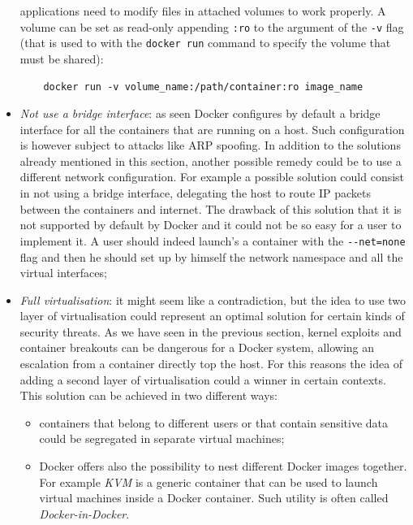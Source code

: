 \documentclass[a4paper,12pt]{article}
\newcommand{\code}[1]{\lstinline|#1|}
\begin{document}
\begin{itemize}
  applications need to modify files in attached volumes to work properly. A
  volume can be set as read-only appending \code{:ro} to the argument of the
  \code{-v} flag (that is used to with the \code{docker run} command to
  specify the volume that must be shared): 
  \begin{lstlisting}
    docker run -v volume_name:/path/container:ro image_name
  \end{lstlisting}
  \item \textit{Not use a bridge interface}: as seen Docker configures by
  default a bridge interface for all the containers that are running on a host.
  Such configuration is however subject to attacks like ARP spoofing. In
  addition to the solutions already mentioned in this section, another possible
  remedy could be to use a different network configuration. For example a
  possible solution could consist in not using a bridge interface, delegating
  the host to route IP packets between the containers and internet. The drawback
  of this solution that it is not supported by default by Docker and it could
  not be so easy for a user to implement it. A user should indeed launch's a
  container with the \code{--net=none} flag and then he should set up by
  himself the network namespace and all the virtual interfaces;
  \item \textit{Full virtualisation}: it might seem like a contradiction, but
  the idea to use two layer of virtualisation could represent an optimal
  solution for certain kinds of security threats. As we have seen in the
  previous section, kernel exploits and container breakouts can be
  dangerous for a Docker system, allowing an escalation from a container
  directly top the host. For this reasons the idea of adding a second layer of
  virtualisation could a winner in certain contexts. This solution can be
  achieved in two different ways: 
  \begin{itemize}
    \item containers that belong to different users or that contain sensitive
    data could be segregated in separate virtual machines;
    \item Docker offers also the possibility to nest different Docker images
    together. For example \textit{KVM} \cite{kvm} is a generic container that
    can be used to launch virtual machines inside a Docker container. Such
    utility is often called \textit{Docker-in-Docker}.
  \end{itemize} 
\end{itemize}
\end{document}

